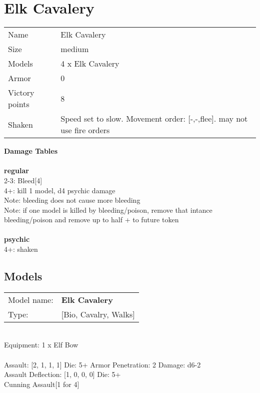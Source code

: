 \section{ Elk Cavalery }

\begin{tabular}{ll}
  Name & Elk Cavalery \\
  Size & medium\\
  Models & 4 x Elk Cavalery\\
  Armor & 0\\
  Victory points & 8\\
  Shaken & Speed set to slow. Movement order: [-,-,flee]. may not use fire orders\\
\end{tabular}




{\bf Damage Tables} \\
\ \\ {\bf regular } \\
2-3: Bleed[4] \\
4+: kill 1 model, d4 psychic damage \\
Note: bleeding does not cause more bleeding \\
Note: if one model is killed by bleeding/poison, remove that intance \\ bleeding/poison and remove up to half + to future token \\
\ \\ {\bf psychic } \\
4+: shaken \\


\pagebreak

\subsection{ Models }

\begin{tabular}{ll}
Model name: & {\bf Elk Cavalery } \\
Type: & [Bio, Cavalry, Walks] \\
\end{tabular}
\ \\
Equipment: 1 x Elf Bow \\
\ \\
Assault: [2, 1, 1, 1] Die: 5+ Armor Penetration: 2 Damage: d6-2 \\
Assault Deflection: [1, 0, 0, 0] Die: 5+\\
\indent Cunning Assault[1 for 4]\\ 
 

